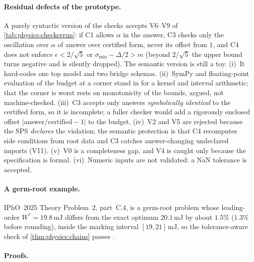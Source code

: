 \paragraph{Residual defects of the prototype.} A purely syntactic version of the checks
accepts V6--V9 of \cref{tab:physics:checkerrun}: if C1 allows $\alpha$ in the answer, C3
checks only the oscillation over $\alpha$ of answer over certified form, never its offset
from $1$, and C4 does not enforce $\epsilon<2/\sqrt5$ or $\sigma_{\min}-\Delta/2>m$ (beyond
$2/\sqrt5$ the upper bound turns negative and is silently dropped). The semantic version is
still a toy. (i)~It hard-codes one top model and two bridge schemas. (ii)~SymPy and
floating-point evaluation of the budget at a corner stand in for a kernel and interval
arithmetic; that the corner is worst rests on monotonicity of the bounds, argued, not
machine-checked. (iii)~C3 accepts only answers \emph{symbolically identical} to the
certified form, so it is incomplete; a fuller checker would add a rigorously enclosed
offset $|\text{answer}/\text{certified}-1|$ to the budget. (iv)~V2 and V5 are rejected
because the SPS \emph{declares} the violation; the semantic protection is that C4
recomputes side conditions from root data and C3 catches answer-changing undeclared imports
(V11). (v)~V0 is a completeness gap, and V4 is caught only because the specification is
formal. (vi)~Numeric inputs are not validated: a NaN tolerance is accepted.

\paragraph{A germ-root example.} IPhO~2025 Theory Problem~2, part~C.4, is a germ-root
problem whose leading-order $W^*=19.8$\,mJ differs from the exact optimum $20.1$\,mJ by
about $1.5\%$ ($1.3\%$ before rounding), inside the marking interval $[19,21]$\,mJ, so the
tolerance-aware check of \cref{thm:physics:chains} passes .

\paragraph{Proofs.}


